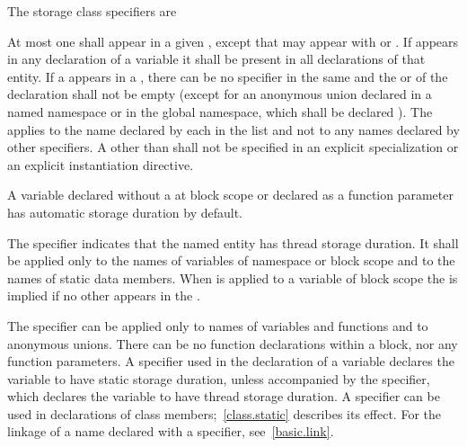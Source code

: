 \pnum
The storage class specifiers are

\begin{bnf}
\br
    \br
    \br
    \br
\end{bnf}

At most one  shall appear in a given
, except that  may appear with  or
. If  appears in any declaration of
a variable it shall be present in all declarations of that entity. If a
appears in a , there can be no
 specifier in the same  and
the  or 
of the declaration shall not be
empty (except for an anonymous union declared in a named namespace or in the
global namespace, which shall be declared
%
). The
 applies to the name declared by each
 in the list and not to any names declared by
other specifiers. A 
other than 
shall not be
specified in an explicit specialization or an
explicit instantiation directive.

\pnum
\begin{note}
A variable declared without a 
at block scope or declared as a function parameter
has automatic storage duration by default.
\end{note}

\pnum
The  specifier
indicates that the named entity has thread storage duration. It
shall be applied only
to the names of variables of namespace
or block scope and to the names of static data members.
When  is applied to a variable of block scope the
  is implied if no other
 appears in the
.

\pnum
{}%
The  specifier can be applied only to names of variables and
functions and to anonymous unions. There can be no
 function declarations within a block, nor any
 function parameters. A  specifier used in
the declaration of a variable declares the variable to have static storage
duration, unless accompanied by the
 specifier, which declares the variable to have thread
storage duration. A  specifier can be
used in declarations of class members;~\ref{class.static} describes its
effect.
%
For the linkage of a name declared with a  specifier,
see~\ref{basic.link}.

